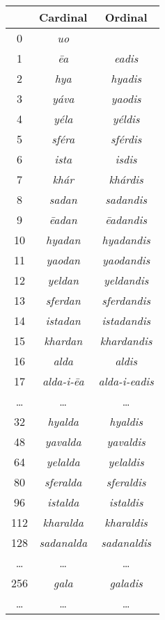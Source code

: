 \begin{table}[H]
\begin{tabular}{ c|c|c }
	        & Cardinal                   & Ordinal             \\
	\hline
	0       & \emph{uo}                  &                     \\
	1       & \emph{ēa}                  & \emph{eadis}        \\
	2       & \emph{hya}                 & \emph{hyadis}       \\
	3       & \emph{yáva}                & \emph{yaodis}       \\
	4       & \emph{yéla}                & \emph{yéldis}       \\
	5       & \emph{sféra}               & \emph{sférdis}      \\
	6       & \emph{ista}                & \emph{isdis}        \\
	7       & \emph{khár}                & \emph{khárdis}      \\
	8       & \emph{sadan}               & \emph{sadandis}     \\
	9       & \emph{ēadan}               & \emph{ēadandis}     \\
	10      & \emph{hyadan}              & \emph{hyadandis}    \\
	11      & \emph{yaodan}              & \emph{yaodandis}    \\
	12      & \emph{yeldan}              & \emph{yeldandis}    \\
	13      & \emph{sferdan}             & \emph{sferdandis}   \\
	14      & \emph{istadan}             & \emph{istadandis}   \\
	15      & \emph{khardan}             & \emph{khardandis}   \\
	16      & \emph{alda}                & \emph{aldis}        \\
	17      & \emph{alda-i-ēa}           & \emph{alda-i-eadis} \\
	…       & …                          & …                   \\
	32      & \emph{hyalda}              & \emph{hyaldis}      \\
	48      & \emph{yavalda}             & \emph{yavaldis}     \\
	64      & \emph{yelalda}             & \emph{yelaldis}     \\
	80      & \emph{sferalda}            & \emph{sferaldis}    \\
	96      & \emph{istalda}             & \emph{istaldis}     \\
	112     & \emph{kharalda}            & \emph{kharaldis}    \\
	128     & \emph{sadanalda}           & \emph{sadanaldis}   \\
	…       & …                          & …                   \\
	256     & \emph{gala}                & \emph{galadis}      \\
	…       & …                          & …                   \\
\end{tabular}
\end{table}
